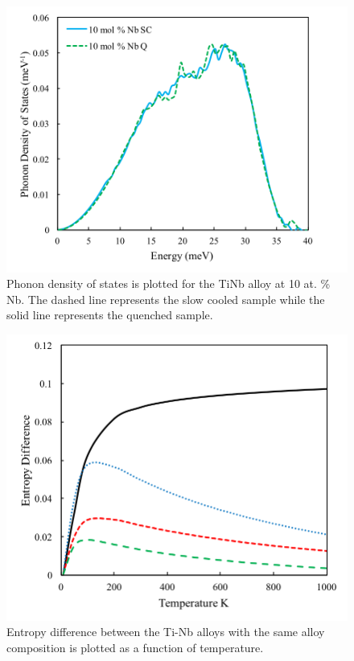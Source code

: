 \pagebreak
\begin{figure}[H]
	\centering
	\includegraphics[width=\textwidth]{Chapter-7/Figures/50dos10.png}
	\caption{Phonon density of states is plotted for the TiNb alloy at 10 at. \% Nb. The dashed line represents the slow cooled sample while the solid line represents the quenched sample.}
	\label{Ch7-figure:50dos10}
\end{figure}

\pagebreak
\begin{figure}[H]
	\centering
	\includegraphics[width=\textwidth]{Chapter-7/Figures/ediff.png}
	\caption{Entropy difference between the Ti-Nb alloys with the same alloy composition is plotted as a function of temperature.}
	\label{Ch7-figure:ediff}
\end{figure}

